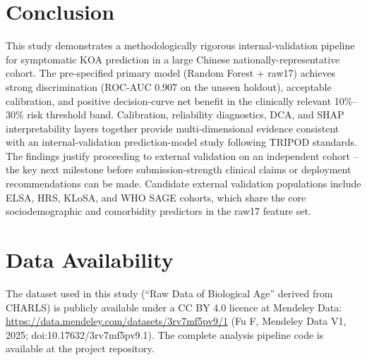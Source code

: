 \documentclass[11pt,a4paper]{article}
\begin{document}
\section{Conclusion}
This study demonstrates a methodologically rigorous internal-validation pipeline for symptomatic KOA prediction in a large Chinese nationally-representative cohort. The pre-specified primary model (Random Forest + raw17) achieves strong discrimination (ROC-AUC 0.907 on the unseen holdout), acceptable calibration, and positive decision-curve net benefit in the clinically relevant 10\%--30\% risk threshold band. Calibration, reliability diagnostics, DCA, and SHAP interpretability layers together provide multi-dimensional evidence consistent with an internal-validation prediction-model study following TRIPOD standards. The findings justify proceeding to external validation on an independent cohort -- the key next milestone before submission-strength clinical claims or deployment recommendations can be made. Candidate external validation populations include ELSA, HRS, KLoSA, and WHO SAGE cohorts, which share the core sociodemographic and comorbidity predictors in the raw17 feature set.

\section*{Data Availability}
The dataset used in this study (``Raw Data of Biological Age'' derived from CHARLS) is publicly available under a CC BY 4.0 licence at Mendeley Data: \url{https://data.mendeley.com/datasets/3rv7mf5pv9/1} (Fu F, Mendeley Data V1, 2025; doi:10.17632/3rv7mf5pv9.1). The complete analysis pipeline code is available at the project repository.
\end{document}
